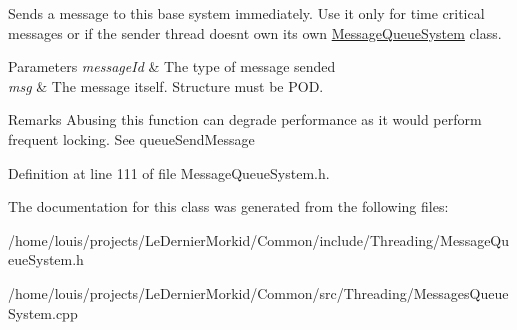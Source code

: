 Sends a message to \textquotesingle{}this\textquotesingle{} base system immediately. Use it only for time critical messages or if the sender thread doesn\textquotesingle{}t own its own \hyperlink{class_common_1_1_mq_1_1_message_queue_system}{Message\+Queue\+System} class. 
\begin{DoxyParams}{Parameters}
{\em message\+Id} & The type of message sended \\
\hline
{\em msg} & The message itself. Structure must be P\+OD. \\
\hline
\end{DoxyParams}
\begin{DoxyRemark}{Remarks}
Abusing this function can degrade performance as it would perform frequent locking. See queue\+Send\+Message 
\end{DoxyRemark}


Definition at line 111 of file Message\+Queue\+System.\+h.



The documentation for this class was generated from the following files\+:\begin{DoxyCompactItemize}
\item 
/home/louis/projects/\+Le\+Dernier\+Morkid/\+Common/include/\+Threading/Message\+Queue\+System.\+h\item 
/home/louis/projects/\+Le\+Dernier\+Morkid/\+Common/src/\+Threading/Messages\+Queue\+System.\+cpp\end{DoxyCompactItemize}
